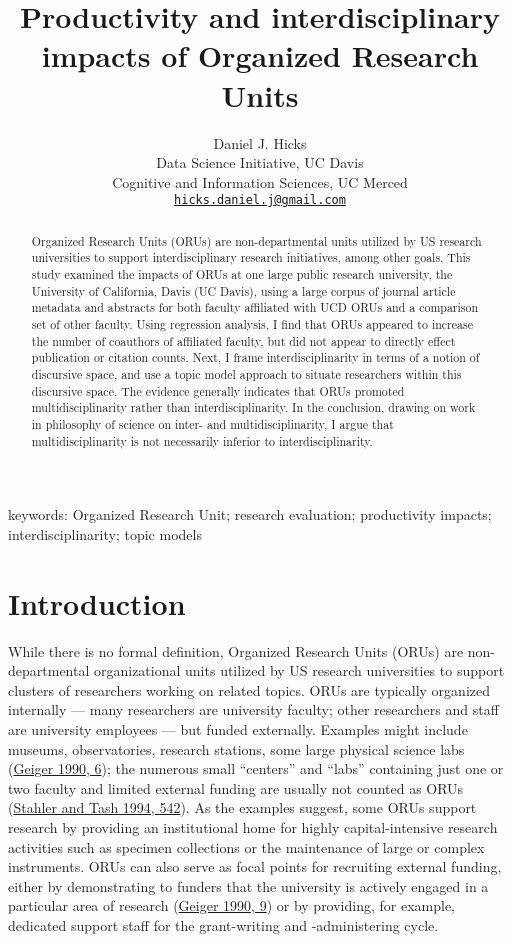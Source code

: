 \documentclass[
  11pt,
]{article}
\title{Productivity and interdisciplinary impacts of Organized Research Units}
\author{Daniel J. Hicks\\
Data Science Initiative, UC Davis\\
Cognitive and Information Sciences, UC Merced\\
\href{mailto:hicks.daniel.j@gmail.com}{\nolinkurl{hicks.daniel.j@gmail.com}}}
\date{}
\begin{document}
\maketitle
\begin{abstract}
Organized Research Units (ORUs) are non-departmental units utilized by US research universities to support interdisciplinary research initiatives, among other goals. This study examined the impacts of ORUs at one large public research university, the University of California, Davis (UC Davis), using a large corpus of journal article metadata and abstracts for both faculty affiliated with UCD ORUs and a comparison set of other faculty. Using regression analysis, I find that ORUs appeared to increase the number of coauthors of affiliated faculty, but did not appear to directly effect publication or citation counts. Next, I frame interdisciplinarity in terms of a notion of discursive space, and use a topic model approach to situate researchers within this discursive space. The evidence generally indicates that ORUs promoted multidisciplinarity rather than interdisciplinarity. In the conclusion, drawing on work in philosophy of science on inter- and multidisciplinarity, I argue that multidisciplinarity is not necessarily inferior to interdisciplinarity.
\end{abstract}

\linenumbers

keywords: Organized Research Unit; research evaluation; productivity impacts; interdisciplinarity; topic models

\hypertarget{introduction}{%
\section{Introduction}\label{introduction}}

While there is no formal definition, Organized Research Units (ORUs) are non-departmental organizational units utilized by US research universities to support clusters of researchers working on related topics. ORUs are typically organized internally --- many researchers are university faculty; other researchers and staff are university employees --- but funded externally. Examples might include museums, observatories, research stations, some large physical science labs (\protect\hyperlink{ref-GeigerOrganizedResearchUnits1990}{Geiger 1990, 6}); the numerous small ``centers'' and ``labs'' containing just one or two faculty and limited external funding are usually not counted as ORUs (\protect\hyperlink{ref-StahlerCentersInstitutesResearch1994}{Stahler and Tash 1994, 542}). As the examples suggest, some ORUs support research by providing an institutional home for highly capital-intensive research activities such as specimen collections or the maintenance of large or complex instruments. ORUs can also serve as focal points for recruiting external funding, either by demonstrating to funders that the university is actively engaged in a particular area of research (\protect\hyperlink{ref-GeigerOrganizedResearchUnits1990}{Geiger 1990, 9}) or by providing, for example, dedicated support staff for the grant-writing and -administering cycle.
\end{document}
